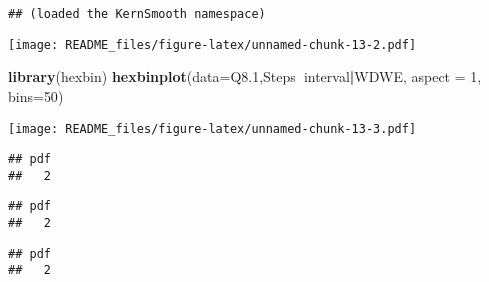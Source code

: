\documentclass[
]{article}
\newenvironment{Shaded}{\begin{snugshade}}{\end{snugshade}}
\newcommand{\DataTypeTok}[1]{\textcolor[rgb]{0.13,0.29,0.53}{#1}}
\newcommand{\DecValTok}[1]{\textcolor[rgb]{0.00,0.00,0.81}{#1}}
\newcommand{\FloatTok}[1]{\textcolor[rgb]{0.00,0.00,0.81}{#1}}
\newcommand{\KeywordTok}[1]{\textcolor[rgb]{0.13,0.29,0.53}{\textbf{#1}}}
\newcommand{\NormalTok}[1]{#1}
\newcommand{\OperatorTok}[1]{\textcolor[rgb]{0.81,0.36,0.00}{\textbf{#1}}}
\begin{document}
\begin{verbatim}
## (loaded the KernSmooth namespace)
\end{verbatim}

\texttt{[image: README\_files/figure-latex/unnamed-chunk-13-2.pdf]}

\begin{Shaded}
\begin{Highlighting}[]
\KeywordTok{library}\NormalTok{(hexbin)}
\KeywordTok{hexbinplot}\NormalTok{(}\DataTypeTok{data=}\NormalTok{Q8}\FloatTok{.1}\NormalTok{,Steps}\OperatorTok{~}\NormalTok{interval}\OperatorTok{|}\NormalTok{WDWE, }\DataTypeTok{aspect =} \DecValTok{1}\NormalTok{, }\DataTypeTok{bins=}\DecValTok{50}\NormalTok{)}
\end{Highlighting}
\end{Shaded}

\texttt{[image: README\_files/figure-latex/unnamed-chunk-13-3.pdf]}

\begin{verbatim}
## pdf 
##   2
\end{verbatim}

\begin{verbatim}
## pdf 
##   2
\end{verbatim}

\begin{verbatim}
## pdf 
##   2
\end{verbatim}
\end{document}
